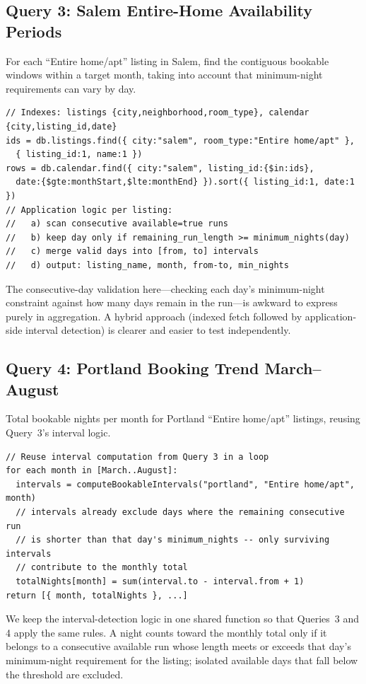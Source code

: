 \documentclass[10pt]{article}
\begin{document}
\subsection{Query 3: Salem Entire-Home Availability Periods}

For each ``Entire home/apt'' listing in Salem, find the contiguous bookable windows within a target month, taking into account that minimum-night requirements can vary by day.

\begin{lstlisting}
// Indexes: listings {city,neighborhood,room_type}, calendar {city,listing_id,date}
ids = db.listings.find({ city:"salem", room_type:"Entire home/apt" },
  { listing_id:1, name:1 })
rows = db.calendar.find({ city:"salem", listing_id:{$in:ids},
  date:{$gte:monthStart,$lte:monthEnd} }).sort({ listing_id:1, date:1 })
// Application logic per listing:
//   a) scan consecutive available=true runs
//   b) keep day only if remaining_run_length >= minimum_nights(day)
//   c) merge valid days into [from, to] intervals
//   d) output: listing_name, month, from-to, min_nights
\end{lstlisting}

The consecutive-day validation here---checking each day's minimum-night constraint against how many days remain in the run---is awkward to express purely in aggregation. A hybrid approach (indexed fetch followed by application-side interval detection) is clearer and easier to test independently.

\subsection{Query 4: Portland Booking Trend March--August}

Total bookable nights per month for Portland ``Entire home/apt'' listings, reusing Query~3's interval logic.

\begin{lstlisting}
// Reuse interval computation from Query 3 in a loop
for each month in [March..August]:
  intervals = computeBookableIntervals("portland", "Entire home/apt", month)
  // intervals already exclude days where the remaining consecutive run
  // is shorter than that day's minimum_nights -- only surviving intervals
  // contribute to the monthly total
  totalNights[month] = sum(interval.to - interval.from + 1)
return [{ month, totalNights }, ...]
\end{lstlisting}

We keep the interval-detection logic in one shared function so that Queries~3 and 4 apply the same rules. A night counts toward the monthly total only if it belongs to a consecutive available run whose length meets or exceeds that day's minimum-night requirement for the listing; isolated available days that fall below the threshold are excluded.
\end{document}
